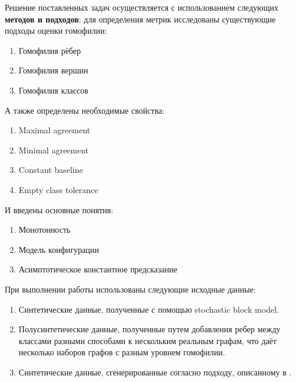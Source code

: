 \documentclass[a4paper,14pt]{article}
\begin{document}
	Решение поставленных задач осуществляется с использованием следующих \textbf{методов и подходов}: для определения метрик исследованы существующие подходы оценки гомофилии:
	
	\begin{enumerate}
		\item Гомофилия рёбер
		
		\item Гомофилия вершин
		
		\item Гомофилия классов
	\end{enumerate}

	А также определены необходимые свойства: 
	
	\begin{enumerate}
		\item Maximal agreement
		
		\item Minimal agreement
		
		\item Constant baseline
		
		\item Empty class tolerance
	\end{enumerate}
	
	И введены основные понятия:
	
	\begin{enumerate}
		\item Монотонность
		
		\item Модель конфигурации
		
		\item Асимптотическое константное предсказание
	\end{enumerate}
	
	При выполнении работы использованы следующие исходные данные:
	
	\begin{enumerate}
		\item Синтетические данные, полученные с помощью stochastic block model.
		
		\item Полусинтетические данные, полученные путем добавления ребер между классами разными способами к нескольким реальным графам, что даёт несколько наборов графов с разным уровнем гомофилии.
	
		\item Синтетические данные, сгенерированные согласно подходу, описанному в \cite{luan2021heterophily}.
	\end{enumerate}
	
\end{document}

